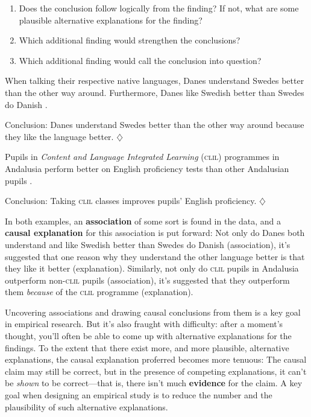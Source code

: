 \documentclass[a4paper]{tufte-book}\usepackage[]{graphicx}\usepackage[]{xcolor}
\newcommand{\term}[1]{\textbf{#1}}
\newcommand*{\parend}[1][$\diamondsuit$]{%
\leavevmode\unskip\penalty9999 \hbox{}\nobreak\hfill
    \quad\hbox{#1}%
}
\begin{document}
\begin{enumerate}
  \item Does the conclusion follow logically from the finding?
        If not, what are some plausible alternative explanations for the finding?
  \item Which additional finding would strengthen the conclusions?
  \item Which additional finding would call the conclusion into question?
\end{enumerate}

When talking their respective native languages, Danes understand
Swedes better than the other way around. Furthermore, Danes
like Swedish better than Swedes do Danish \citep[e.g.,][]{Delsing2005}.

Conclusion: 
Danes understand Swedes better than the other way around 
because they like the language better.
\parend

Pupils in \textit{Content and Language Integrated Learning} (\textsc{clil}) programmes 
in Andalusia perform better on English proficiency tests 
than other Andalusian pupils \citep{Lorenzo2010}.

Conclusion: 
Taking \textsc{clil} classes improves pupils' English proficiency.
\parend

\newpage

In both examples, an \term{association} of some sort is found in the data,
and a \term{causal explanation} for this association is put forward: 
Not only do Danes both understand and like Swedish better than Swedes do Danish (association), 
it's suggested that one reason why they understand the other language better is that they like it better (explanation).
Similarly, not only do \textsc{clil} pupils in Andalusia outperform non-\textsc{clil} pupils (association),
it's suggested that they outperform them \emph{because} of the \textsc{clil} programme (explanation).

Uncovering associations and drawing causal conclusions from them is a key
goal in empirical research. But it's also fraught with difficulty: after a
moment's thought, you'll often be able to come up with alternative explanations
for the findings. To the extent that there exist more, and more plausible,
alternative explanations, the causal explanation proferred becomes more tenuous:
The causal claim may still be correct, but in the presence of competing explanations,
it can't be \emph{shown} to be correct---that is, there isn't much \term{evidence}
for the claim.
A key goal when designing an empirical study is to reduce the number and the
plausibility of such alternative explanations.
\end{document}
